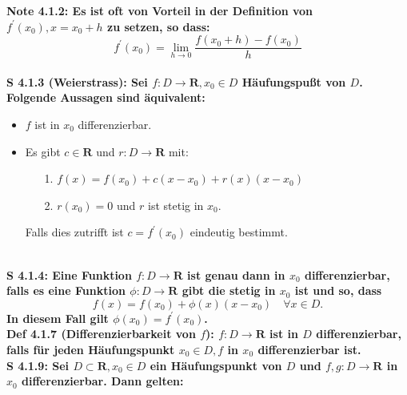 \documentclass[7pt,landscape, margin = 0.1mm]{article}
\newcommand{\DEF}[2]{\color{chaptercolor}\bf{Def #1}:\color{black}    \hspace{0.2cm} #2 \\}
\newcommand{\NOTE}[2]{\color{chaptercolor}\bf{Note #1}:\color{black}    \hspace{0.2cm} #2 \\}
\newcommand{\SA}[2]{\color{chaptercolor}\bf{S #1}:\color{black}    \hspace{0.2cm} #2 \\}
\begin{document}
\begin{multicols}{4}
\begin{flushleft}
\NOTE{4.1.2}{Es ist oft von Vorteil in der Definition von $f^{\prime}\left(x_0\right), x=x_0+h$ zu setzen, so dass:
$$
f^{\prime}\left(x_0\right)=\lim _{h \rightarrow 0} \frac{f\left(x_0+h\right)-f\left(x_0\right)}{h}
$$}
\SA{4.1.3 (Weierstrass)}{Sei $f: D \longrightarrow \mathbf{R}, x_0 \in D$ Häufungspußt von $D$. Folgende Aussagen sind äquivalent:
\begin{itemize}

\item $f$ ist in $x_0$ differenzierbar.
\item Es gibt $c \in \mathbf{R}$ und $r: D \longrightarrow \mathbf{R}$ mit:
\begin{itemize}
\item[1.] $f(x)=f\left(x_0\right)+c\left(x-x_0\right)+r(x)\left(x-x_0\right)$
\item[2.] $r\left(x_0\right)=0$ und $r$ ist stetig in $x_0$.
\end{itemize}

Falls dies zutrifft ist $c=f^{\prime}\left(x_0\right)$ eindeutig bestimmt.\end{itemize}}
\SA{4.1.4}{Eine Funktion $f: D \longrightarrow \mathbf{R}$ ist genau dann in $x_0$ differenzierbar, falls es eine Funktion $\phi: D \longrightarrow \mathbf{R}$ gibt die stetig in $x_0$ ist und so, dass
$$
f(x)=f\left(x_0\right)+\phi(x)\left(x-x_0\right) \quad \forall x \in D .
$$
In diesem Fall gilt $\phi\left(x_0\right)=f^{\prime}\left(x_0\right)$.}
\DEF{4.1.7 (Differenzierbarkeit von $f$)}{$f: D \longrightarrow \mathbf{R}$ ist in $D$ differenzierbar, falls für jeden Häufungspunkt $x_0 \in D, f$ in $x_0$ differenzierbar ist.}
\SA{4.1.9}{Sei $D \subset \mathbf{R}, x_0 \in D$ ein Häufungspunkt von $D$ und $f, g: D \longrightarrow \mathbf{R}$ in $x_0$ differenzierbar. Dann gelten:
\begin{itemize}



\end{itemize}}
\end{flushleft}
\end{multicols}
\end{document}
